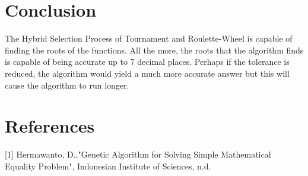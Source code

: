 \documentclass{acm_proc_article-sp}
\begin{document}
\section{Conclusion}
The Hybrid Selection Process of Tournament and Roulette-Wheel is capable of finding the roots of the functions. All the more, the roots that the algorithm finds is capable of being accurate up to 7 decimal places. Perhaps if the tolerance is reduced, the algorithm would yield a much more accurate answer but this will cause the algorithm to run longer.

\section{References}
[1] Hermawanto, D.,"Genetic Algorithm for Solving Simple Mathematical Equality Problem", Indonesian Institute of Sciences, n.d.
\end{document}
